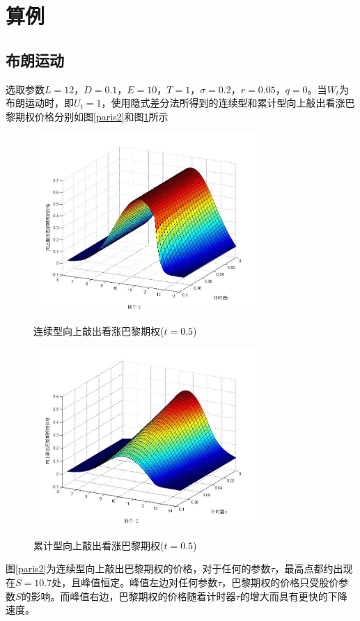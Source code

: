 \documentclass{ctexart} %
\begin{document}
\section{算例}
\subsection{布朗运动}
选取参数$L=12$，$D=0.1$，$E=10$，$T=1$，$\sigma=0.2$，$r=0.05$，$q=0$。当$W_t$为布朗运动时，即$U_t=1$，使用隐式差分法所得到的连续型和累计型向上敲出看涨巴黎期权价格分别如图\ref{paris2}和图\ref{parisc2}所示
\begin{figure}[H]
\begin{minipage}{0.48\linewidth}
\label{paris2}
\includegraphics[width=8.5cm]{code/paris2.jpg}
\caption{连续型向上敲出看涨巴黎期权($t=0.5$)}
\end{minipage}
\begin{minipage}{0.48\linewidth}
\label{parisc2}
\includegraphics[width=8.5cm]{code/parisc2.jpg}
\caption{累计型向上敲出看涨巴黎期权($t=0.5$)}
\end{minipage}
\end{figure}
图\ref{paris2}为连续型向上敲出巴黎期权的价格，对于任何的参数$\tau$，最高点都约出现在$S=10.7$处，且峰值恒定。峰值左边对任何参数$\tau$，巴黎期权的价格只受股价参数$S$的影响。而峰值右边，巴黎期权的价格随着计时器$\tau$的增大而具有更快的下降速度。
\end{document}
